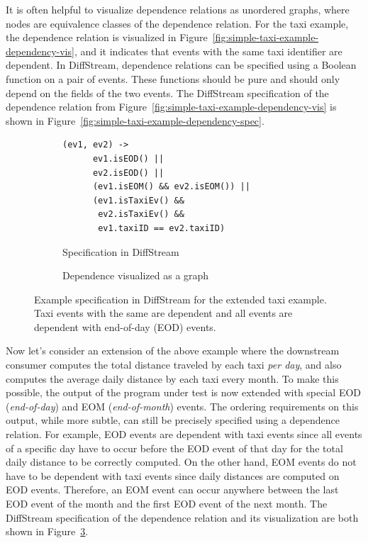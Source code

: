 It is often helpful to visualize dependence relations as unordered
graphs, where nodes are equivalence classes of the dependence
relation. For the taxi example, the dependence relation is visualized
in Figure~\ref{fig:simple-taxi-example-dependency-vis}, and it indicates that
events with the same taxi identifier are dependent. In DiffStream,
dependence relations can be specified using a Boolean function on a pair
of events. These functions should be pure and should only depend on
the fields of the two events. The DiffStream specification of the dependence relation from Figure~\ref{fig:simple-taxi-example-dependency-vis} is shown in Figure~\ref{fig:simple-taxi-example-dependency-spec}.

\begin{figure}[t]
  \centering \footnotesize{}
  \begin{subfigure}[b]{0.56\textwidth}
    \centering
    \begin{lstlisting}[basicstyle=\ttfamily\small,linewidth=7.3cm]
  (ev1, ev2) ->
      ev1.isEOD() ||
      ev2.isEOD() ||
      (ev1.isEOM() && ev2.isEOM()) ||
      (ev1.isTaxiEv() &&
       ev2.isTaxiEv() &&
       ev1.taxiID == ev2.taxiID)
    \end{lstlisting}
    \caption{Specification in DiffStream}
    \label{fig:extended-taxi-example-dependency-spec}
  \end{subfigure}%
  \qquad
  \begin{subfigure}[b]{0.36\textwidth}
    \centering
    \caption{Dependence visualized as a graph}
    \label{fig:extended-taxi-example-dependency-vis}
  \end{subfigure}
  \caption{Example specification in DiffStream for the extended taxi example. Taxi events with the same  are dependent
      and all events are dependent with end-of-day (EOD) events.}
  \label{fig:extended-example-dependencies}
\end{figure}

Now let's consider an extension of the above example where the downstream consumer
computes the total distance traveled by each taxi \emph{per
  day}, and also computes the average daily distance by each taxi
every month. To make this possible, the output of the program under test
is now
extended with special EOD (\emph{end-of-day}) and EOM (\emph{end-of-month})
events. The ordering requirements on this output, while more subtle, can still be
precisely specified using a dependence relation.
For example, EOD events are dependent with taxi events since all events of a specific day have to occur before the EOD event of that day for the total daily distance to be correctly computed. On the other hand, EOM events do not have to be dependent with taxi events since daily distances are computed on EOD events. Therefore, an EOM event can occur anywhere between the last EOD event of the month and the first EOD event of the next month.
The DiffStream specification of the dependence relation and its visualization are both shown in Figure~\ref{fig:extended-example-dependencies}.

